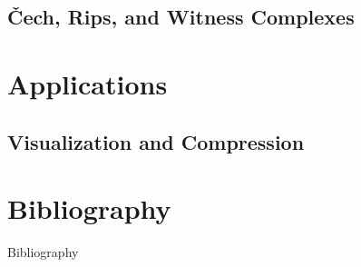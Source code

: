 \subsection{\v{C}ech, Rips, and Witness Complexes}
\begin{frame}
\end{frame}

\section{Applications}
\subsection{Visualization and Compression}
\begin{frame}
\end{frame}

\section{Bibliography}
\begin{frame}{Bibliography}
	\nocite{wagner}
	\nocite{hatcher}
	\nocite{singh}
	\begingroup
	\renewcommand{\section}[2]{}%
	
	\endgroup
\end{frame}





